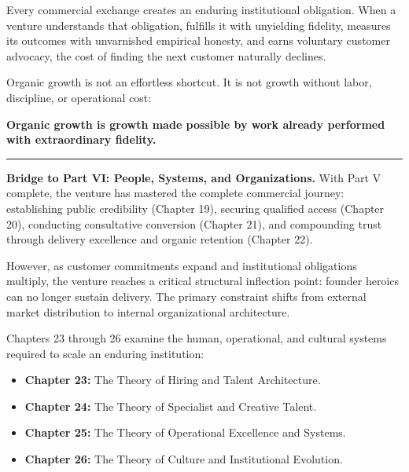 Every commercial exchange creates an enduring institutional obligation. When a venture understands that obligation, fulfills it with unyielding fidelity, measures its outcomes with unvarnished empirical honesty, and earns voluntary customer advocacy, the cost of finding the next customer naturally declines.

Organic growth is not an effortless shortcut. It is not growth without labor, discipline, or operational cost:
\begin{center}
\textbf{Organic growth is growth made possible by work already performed with extraordinary fidelity.}
\end{center}

\vspace{8pt}
\begin{center}
\rule{0.6\columnwidth}{0.4pt}
\end{center}
\vspace{8pt}

\noindent\textbf{Bridge to Part VI: People, Systems, and Organizations.}  
With Part V complete, the venture has mastered the complete commercial journey: establishing public credibility (Chapter 19), securing qualified access (Chapter 20), conducting consultative conversion (Chapter 21), and compounding trust through delivery excellence and organic retention (Chapter 22). 

However, as customer commitments expand and institutional obligations multiply, the venture reaches a critical structural inflection point: founder heroics can no longer sustain delivery. The primary constraint shifts from external market distribution to internal organizational architecture. 

Chapters 23 through 26 examine the human, operational, and cultural systems required to scale an enduring institution:
\begin{itemize}[leftmargin=*]
\item \textbf{Chapter 23:} The Theory of Hiring and Talent Architecture.
\item \textbf{Chapter 24:} The Theory of Specialist and Creative Talent.
\item \textbf{Chapter 25:} The Theory of Operational Excellence and Systems.
\item \textbf{Chapter 26:} The Theory of Culture and Institutional Evolution.
\end{itemize}
